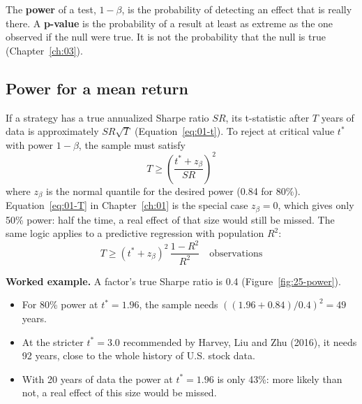 The \textbf{power} of a test, $1 - \beta$, is the probability of detecting an effect that is really there. A \textbf{p-value} is the probability of a result at least as extreme as the one observed if the null were true. It is not the probability that the null is true (Chapter~\ref{ch:03}).

\subsection{Power for a mean return}

If a strategy has a true annualized Sharpe ratio $SR$, its t-statistic after $T$ years of data is approximately $SR\sqrt{T}$ (Equation~\eqref{eq:01-t}). To reject at critical value $t^*$ with power $1 - \beta$, the sample must satisfy
\begin{equation}
  T \geq \left(\frac{t^* + z_\beta}{SR}\right)^2
  \label{eq:25-power}
\end{equation}
where $z_\beta$ is the normal quantile for the desired power (0.84 for 80\%). Equation~\eqref{eq:01-T} in Chapter~\ref{ch:01} is the special case $z_\beta = 0$, which gives only 50\% power: half the time, a real effect of that size would still be missed. The same logic applies to a predictive regression with population $R^2$:
\begin{equation}
  T \geq (t^* + z_\beta)^2\,\frac{1 - R^2}{R^2} \quad \text{observations}
  \label{eq:25-power-r2}
\end{equation}

\textbf{Worked example.} A factor's true Sharpe ratio is 0.4 (Figure~\ref{fig:25-power}).

\begin{itemize}
  \item For 80\% power at $t^* = 1.96$, the sample needs $((1.96 + 0.84)/0.4)^2 = 49$ years.
  \item At the stricter $t^* = 3.0$ recommended by Harvey, Liu and Zhu (2016), it needs 92 years, close to the whole history of U.S. stock data.
  \item With 20 years of data the power at $t^* = 1.96$ is only 43\%: more likely than not, a real effect of this size would be missed.
\end{itemize}

